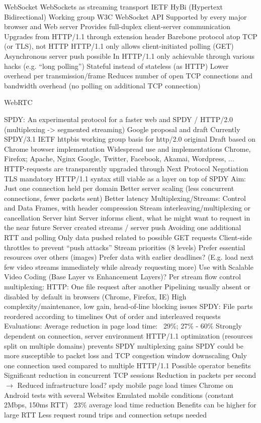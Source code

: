 WebSocket \cite{rfc6455}
WebSockets as streaming transport \cite{w3c2011websockets} \cite{heise2011websockets}
 IETF HyBi (Hypertext Bidirectional) Working group
 W3C WebSocket API
 Supported by every major browser and Web server
 Provides full-duplex client-server communication
	Upgrades from HTTP/1.1 through extension header
	Barebone protocol atop TCP (or TLS), not HTTP
	HTTP/1.1 only allows client-initiated polling (GET)
	Asynchronous server push possible
		In HTTP/1.1 only achievable through various hacks (e.g. ``long polling'')
		Stateful instead of stateless (as HTTP)
Lower overhead per transmission/frame
Reduces number of open TCP connections and bandwidth overhead (no polling on additional TCP connection)


WebRTC \cite{webrtcdraft}


SPDY: An experimental protocol for a faster web \cite{google2011SPDYdef} and \cite{google2010SPDYwp} 
SPDY / \gls{HTTP}/2.0 (multiplexing -> segmented streaming)
 Google proposal and draft
	Currently SPDY/3.1 
	IETF httpbis working group basis for http/2.0
 original Draft based on Chrome browser implementation
 Widespread use and implementations
	Chrome, Firefox; Apache, Nginx
	Google, Twitter, Facebook, Akamai, Wordpress, ...
	HTTP-requests are transparently upgraded through Next Protocol Negotiation
 TLS mandatory
 HTTP/1.1 syntax still viable as a layer on top of SPDY
 Aim: Just one connection held per domain
	Better server scaling (less concurrent connections, fewer packets sent)
	Better latency
Multiplexing/Streams:
 Control and Data Frames, with header compression
 Stream interleaving/multiplexing or cancellation
 Server hint
	Server informs client, what he might want to request in the near future
 Server created streams / server push
	Avoiding one additional RTT and polling
	Only data pushed related to possible GET requests
	Client-side throttles to prevent ``push attacks''
 Stream priorities (8 levels)
	Prefer essential resources over others (images)
	Prefer data with earlier deadlines? (E.g. load next few video streams immediately while already requesting more)
 Use with Scalable Video Coding (Base Layer vs Enhancement Layers)?
 Per stream flow control
multiplexing:
 HTTP: One file request after another
	Pipelining usually absent or disabled by default in browsers (Chrome, Firefox, IE)
	High complexity/maintenance, low gain, head-of-line blocking issues
 SPDY: File parts reordered according to timelines
	Out of order and interleaved requests
Evaluations:
	Average reduction in page load time: ~29\%; 27\% - 60\%
	Strongly dependent on connection, server environment
	HTTP/1.1 optimization (resources split on multiple domains) prevents SPDY multiplexing gains
 SPDY could be more susceptible to packet loss and TCP congestion window downscaling
	Only one connection used compared to multiple HTTP/1.1
 Possible operator benefits
	Significant reduction in concurrent TCP sessions
	Reduction in packets per second
	$\rightarrow$ Reduced infrastructure load?
spdy mobile page load times
 Chrome on Android tests with several Websites
 Emulated mobile conditions (constant 2Mbps, 150ms RTT)
 ~23\% average load time reduction
 Benefits can be higher for large RTT
	Less request round trips and connection setups needed



